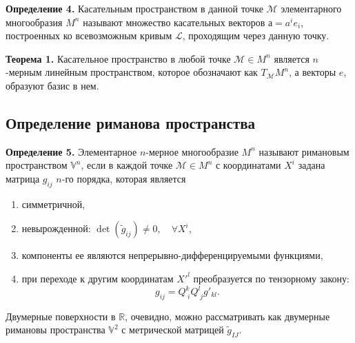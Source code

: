 \documentclass[14pt,a4paper]{scrartcl}
\begin{document}
\textbf{Определение 4.} Касательным пространством в данной точке $\mathcal{M}$ элементарного многообразия $M^n$ называют множество касательных векторов $а = a^ie_i$, построенных ко всевозможным кривым $\mathcal{L}$, проходящим через данную точку.


\textbf{Теорема 1.} Касательное пространство в любой точке $\mathcal{M} \in M^n$ является $n$-мерным линейным пространством, которое обозначают как $T_{\mathcal{M}}M^n$, а векторы $e$, образуют базис в нем.


\subsection{Определение риманова пространства}
\textbf{Определение 5.} Элементарное $n$-мерное многообразие $M^n$ называют римановым пространством $\mathbb{V}^n$, если в каждой точке $\mathcal{M} \in M^n$ с координатами $X^i$ задана матрица $g_{ij}$ $n$-го порядка, которая является
\begin{enumerate}
	\item симметричной,
	\item невырожденной: $\det (\tilde{g}_{ij}) \neq 0, \quad \forall X^i$,
	\item компоненты ее являются непрерывно-дифференцируемыми функциями,
	\item при переходе к другим координатам $X'^l$ преобразуется по тензорному закону:
	\begin{equation}\label{eq10}
		g_{ij} = Q_{\; i}^k Q_{\; j}^l g'_{kl}.
	\end{equation}
\end{enumerate}


Двумерные поверхности в $\mathbb{R}$, очевидно, можно рассматривать как двумерные римановы пространства $\mathbb{V}^2$ с метрической матрицей $\tilde{g}_{IJ}$.
\end{document}
